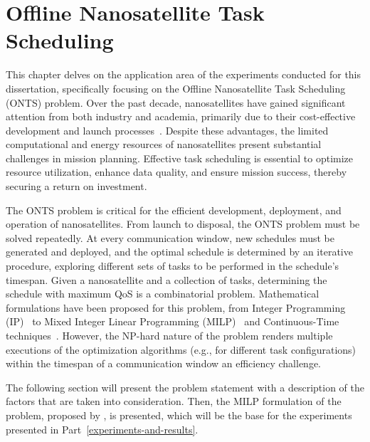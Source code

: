 

\chapter{Offline Nanosatellite Task Scheduling}\label{chap:onts}

This chapter delves on the application area of the experiments conducted for this dissertation, specifically focusing on the Offline Nanosatellite Task Scheduling (ONTS) problem.
Over the past decade, nanosatellites have gained significant attention from both industry and academia, primarily due to their cost-effective development and launch processes~\cite{shiromaCubeSatsBrightFuture2011,luciaComputationalNanosatelliteConstellations2021,nagelNanosatellitesAppliedOptical2020,saeedCubeSatCommunicationsRecent2020}.
Despite these advantages, the limited computational and energy resources of nanosatellites present substantial challenges in mission planning.
Effective task scheduling is essential to optimize resource utilization, enhance data quality, and ensure mission success, thereby securing a return on investment.

The ONTS problem is critical for the efficient development, deployment, and operation of nanosatellites.
From launch to disposal, the ONTS problem must be solved repeatedly.
At every communication window, new schedules must be generated and deployed, and the optimal schedule is determined by an iterative procedure, exploring different sets of tasks to be performed in the schedule's timespan.
Given a nanosatellite and a collection of tasks, determining the schedule with maximum QoS is a combinatorial problem.
Mathematical formulations have been proposed for this problem, from Integer Programming (IP)~\cite{rigoTaskSchedulingOptimal2021} to Mixed Integer Linear Programming (MILP)~\cite{rigoNanosatelliteTaskScheduling2021,semanEnergyAwareTaskScheduling2022} and Continuous-Time techniques~\cite{camponogaraContinuoustimeFormulationOptimal2022}.
However, the NP-hard nature of the problem renders multiple executions of the optimization algorithms (e.g., for different task configurations) within the timespan of a communication window an efficiency challenge.

The following section will present the problem statement with a description of the factors that are taken into consideration.
Then, the MILP formulation of the problem, proposed by , is presented, which will be the base for the experiments presented in Part~\ref{experiments-and-results}.

